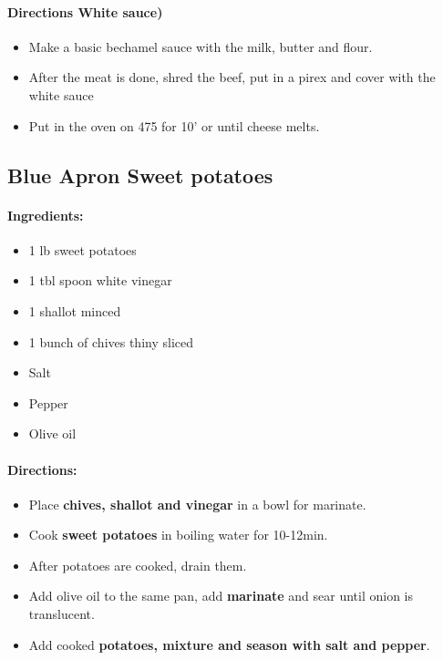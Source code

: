 \documentclass{article}
\begin{document}
\paragraph{Directions White sauce)}
\begin{itemize}
	\item Make a basic bechamel sauce with the milk, butter and flour.
	\item After the meat is done, shred the beef, put in a pirex and cover with the white sauce
	\item Put in the oven on 475 for 10' or until cheese melts.
\end{itemize}

\subsection{Blue Apron Sweet potatoes}

\paragraph{Ingredients:}

\begin{itemize}
	\item 1 lb sweet potatoes
	\item 1 tbl spoon white vinegar
	\item 1 shallot minced
	\item 1 bunch of chives thiny sliced
	\item Salt
	\item Pepper
	\item Olive oil
\end{itemize}

\paragraph{Directions:}
\begin{itemize}
	\item Place \textbf{chives, shallot and vinegar} in a bowl for marinate.
	\item Cook \textbf{sweet potatoes} in boiling water for 10-12min.
	\item After potatoes are cooked, drain them.
	\item Add olive oil to the same pan, add \textbf{marinate} and sear until onion is translucent.
	\item Add cooked \textbf{potatoes, mixture and season with salt and pepper}.
\end{itemize}
\end{document}

